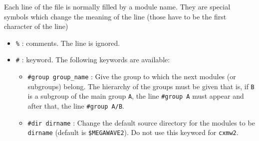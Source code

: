 Each line of the file is normally filled by a module name.
They are special symbols which change the meaning of the line (those have to be the first character of the line)
\begin{itemize}
\item \verb+%+ : comments. The line is ignored. 
\item \verb+#+ : keyword. The following keywords are available:
 \begin{itemize}
   \item \verb+#group group_name+ : 
        Give the group to which the next modules (or subgroups) belong. 
        The hierarchy of the groups must be given that is, if \verb+B+ is a subgroup of the main group \verb+A+, the line \verb+#group A+ must appear and after that, the line \verb+#group A/B+.
   \item \verb+#dir dirname+ : 
        Change the default source directory for the modules to be \verb+dirname+ (default is \verb+$MEGAWAVE2+). Do not use this keyword for \verb+cxmw2+.
 \end{itemize}
\end{itemize}


